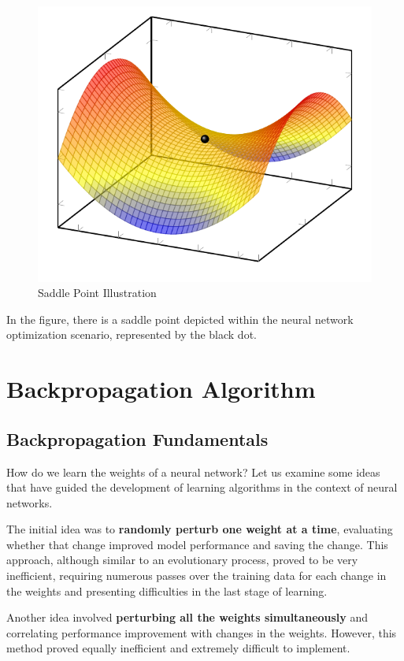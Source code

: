 \begin{figure}[!htbp]
    \centering
    \includegraphics[scale=0.88]{tikz/chapter2 - Saddle Point.pdf}
    \caption{Saddle Point Illustration}
\end{figure}

In the figure, there is a saddle point depicted within the neural network optimization scenario, represented by the black dot. 

\section{Backpropagation Algorithm}

\subsection{Backpropagation Fundamentals}
How do we learn the weights of a neural network? Let us examine some ideas that have guided the development of learning algorithms in the context of neural networks.

The initial idea was to \textbf{randomly perturb one weight at a time}, evaluating whether that change improved model performance and saving the change. This approach, although similar to an evolutionary process, proved to be very inefficient, requiring numerous passes over the training data for each change in the weights and presenting difficulties in the last stage of learning.

Another idea involved \textbf{perturbing all the weights simultaneously} and correlating performance improvement with changes in the weights. However, this method proved equally inefficient and extremely difficult to implement.

